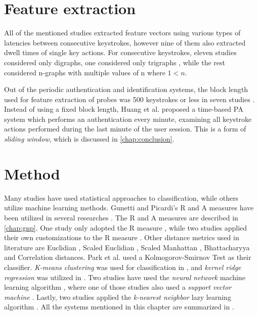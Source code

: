 \documentclass[informationsecurity]{gucmasterproject}
\begin{document}
\section{Feature extraction}
All of the mentioned studies extracted feature vectors using various types of latencies between consecutive keystrokes, however nine of them \cite{superResults, Pinto2014, Ahmed, KIM2017, Janakiraman2007, Monrose, BOURS201236, mondal, monaco} also extracted dwell times of single key actions.
For consecutive keystrokes, eleven studies \cite{davoudi2009, davoudi2010, Ahmed, KIM2017, Solami, Janakiraman2007, Monrose, BOURS201236, mondal, monaco, park} considered only digraphs, one considered only trigraphs \cite{900words}, while the rest considered n-graphs with multiple values of n where $1<n$.

Out of the periodic authentication and identification systems, the block length used for feature extraction of probes was 500 keystrokes or less in seven studies \cite{Messerman, superResults, Pinto2014, Ahmed, hu, park}.
Instead of using a fixed block length, Huang et al. \cite{sliding} proposed a time-based PA system which performs an authentication every minute, examining all keystroke actions performed during the last minute of the user session.
This is a form of \textit{sliding window}, which is discussed in \cref{chap:conclusion}.

\section{Method}
Many studies have used statistical approaches to classification, while others utilize machine learning methods. 
Gunetti and Picardi's \cite{gnp} R and A measures have been utilized in several researches \cite{gnp, superResults, Pinto2014, hu, sliding}.
The R and A measures are described in \cref{chap:gnp}.
One study only adopted the R measure \cite{Messerman}, while two studies applied their own customizations to the R measure \cite{davoudi2009, davoudi2010}.
Other distance metrics used in literature are Euclidian \cite{Monrose}, Scaled Euclidian \cite{mondal}, Scaled Manhattan \cite{BOURS201236}, Bhattacharyya \cite{Janakiraman2007} and Correlation \cite{mondal} distances.
Park et al. \cite{park} used a Kolmogorov-Smirnov Test as their classifier.
\textit{K-means clustering} was used for classification in \cite{KIM2017, Solami}, and \textit{kernel ridge regression} was utilized in \cite{900words}.
Two studies have used the \textit{neural network} machine learning algorithm \cite{Ahmed, mondal}, where one of those studies also used a \textit{support vector machine} \cite{mondal}.
Lastly, two studies applied the \textit{k-nearest neighbor} lazy learning algorithm \cite{hu, monaco}.
All the systems mentioned in this chapter are summarized in .
\end{document}
